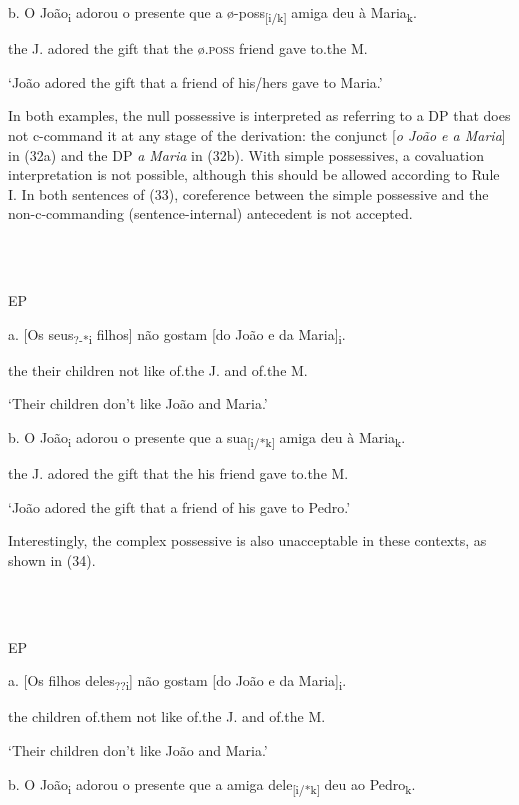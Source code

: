 \documentclass[output=paper]{langsci/langscibook}
\begin{document}
  b.  O João\textsubscript{i} adorou o presente que a ø-poss\textsubscript{[i/k]} amiga deu à Maria\textsubscript{k}.

the J. adored the gift that the ø\textsc{.poss} friend gave to.the M.

‘João adored the gift that a friend of his/hers gave to Maria.’

In both examples, the null possessive is interpreted as referring to a DP that does not c-command it at any stage of the derivation: the conjunct [\textit{o João e a Maria}] in (32a) and the DP \textit{a Maria} in (32b). With simple possessives, a covaluation interpretation is not possible, although this should be allowed according to Rule I. In both sentences of (33), coreference between the simple possessive and the non-c-commanding (sentence-internal) antecedent is not accepted.

\ea%
    \label{ex:key:33}
    \gll\\
        \\
    \glt
    \z

          EP

  a.  [Os seus\textsubscript{?-*i} filhos] não gostam [do João e da Maria]\textsubscript{i}.

the their children not like of.the J. and of.the M.

‘Their children don’t like João and Maria.’

  b.  O João\textsubscript{i} adorou o presente que a sua\textsubscript{[i/*k]} amiga deu à Maria\textsubscript{k}.

the J. adored the gift that the his friend gave to.the M.

‘João adored the gift that a friend of his gave to Pedro.’

Interestingly, the complex possessive is also unacceptable in these contexts, as shown in (34).

\ea%
    \label{ex:key:34}
    \gll\\
        \\
    \glt
    \z

          EP

  a.  [Os filhos deles\textsubscript{??i}] não gostam [do João e da Maria]\textsubscript{i}.

the children of.them not like of.the J. and of.the M.

‘Their children don’t like João and Maria.’

  b.  O João\textsubscript{i} adorou o presente que a amiga dele\textsubscript{[i/*k]} deu ao Pedro\textsubscript{k}.
\end{document}
